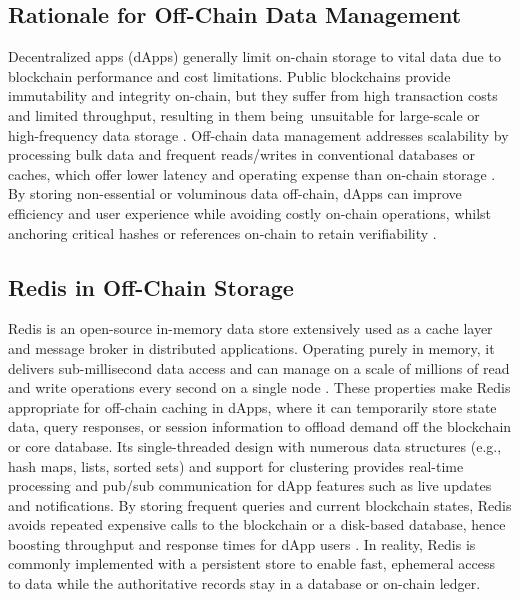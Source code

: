 \documentclass[a4paper,10pt]{report}
\begin{document}
\subsection{Rationale for Off-Chain Data Management}
Decentralized apps (dApps) generally limit on-chain storage to vital data due to blockchain performance and cost limitations.  Public blockchains provide immutability and integrity on-chain, but they suffer from high transaction costs and limited throughput, resulting in them being unsuitable for large-scale or high-frequency data storage \cite{eren2025storage}.  Off-chain data management addresses scalability by processing bulk data and frequent reads/writes in conventional databases or caches, which offer lower latency and operating expense than on-chain storage \cite{eren2025storage}.  By storing non-essential or voluminous data off-chain, dApps can improve efficiency and user experience while avoiding costly on-chain operations, whilst anchoring critical hashes or references on-chain to retain verifiability \cite{lopez2019health, helmer2018ethernitydb}.

\subsection{Redis in Off-Chain Storage}
Redis is an open-source in-memory data store extensively used as a cache layer and message broker in distributed applications.  Operating purely in memory, it delivers sub-millisecond data access and can manage on a scale of millions of read and write operations every second on a single node \cite{aws2017redis}.  These properties make Redis appropriate for off-chain caching in dApps, where it can temporarily store state data, query responses, or session information to offload demand off the blockchain or core database.  Its single-threaded design with numerous data structures (e.g., hash maps, lists, sorted sets) and support for clustering provides real-time processing and pub/sub communication for dApp features such as live updates and notifications.  By storing frequent queries and current blockchain states, Redis avoids repeated expensive calls to the blockchain or a disk-based database, hence boosting throughput and response times for dApp users \cite{ibm2021redis, aws2017redis}.  In reality, Redis is commonly implemented with a persistent store to enable fast, ephemeral access to data while the authoritative records stay in a database or on-chain ledger.
\end{document}
